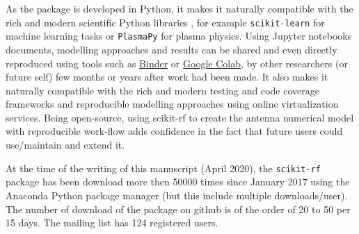 As the package is developed in Python, it makes it naturally compatible with the rich and modern scientific Python libraries , for example  \texttt{scikit-learn} for machine learning tasks  or \texttt{PlasmaPy}  for plasma physics. Using Jupyter notebooks documents, modelling approaches and results can be shared and even directly reproduced using tools such as \href{https://mybinder.org/}{Binder} or \href{https://colab.research.google.com/}{Google Colab}, by other researchers (or future self) few months or years after work had been made. It also makes it naturally compatible with the rich and modern testing and code coverage frameworks and reproducible modelling approaches using online
virtualization services. Being open-source, using scikit-rf to create the antenna numerical model with reproducible work-flow adds confidence
in the fact that future users could use/maintain and extend it.

At the time of the writing of this manuscript (April 2020), the \texttt{scikit-rf} package has been download more then 50000 times since January 2017 using the Anaconda Python package manager (but this include multiple downloads/user). The number of download of the package on github is of the order of 20 to 50 per 15 days. The mailing list has 124 registered users.